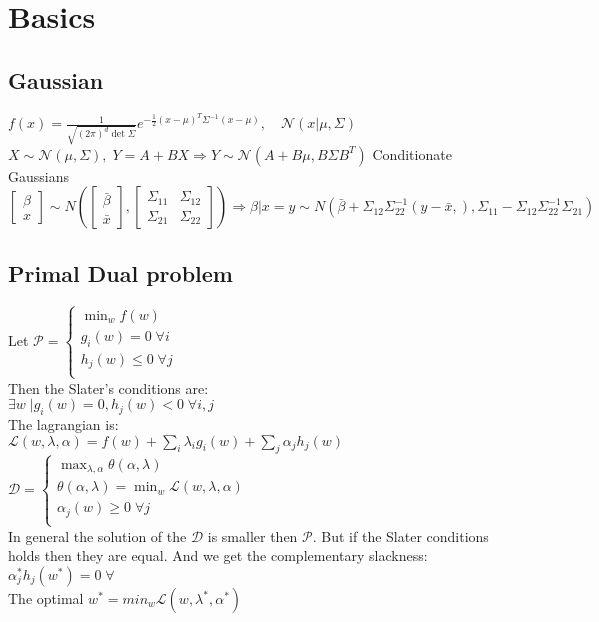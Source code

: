 \section{Basics}
\subsection*{Gaussian}
$f(x) = \frac{1}{\sqrt{(2\pi)^d\det\Sigma}} e^{- \frac{1}{2} (x-\mu)^T \Sigma^{-1} (x-\mu)},\quad \mathcal{N}(x|\mu, \Sigma)$\\
$X {\sim} \mathcal{N}(\mu,\Sigma),\;Y{=}A{+}BX \Rightarrow Y{\sim}\mathcal{N}(A{+}B\mu,B\Sigma B^T)$ 
Conditionate Gaussians\\
\(
\begin{bmatrix} \beta \\ x \end{bmatrix} \sim N\left(\begin{bmatrix}\bar{\beta} \\ \bar{x}\end{bmatrix},\begin{bmatrix} \Sigma_{11}&\Sigma_{12} \\\Sigma_{21}&\Sigma_{22} \end{bmatrix}\right)
\Rightarrow\beta\vert x=y \sim N\left(\bar{\beta} + \Sigma_{12}\Sigma^{-1}_{22}(y-\bar{x}, ) , \Sigma_{11}-\Sigma_{12}\Sigma^{-1}_{22}\Sigma_{21}\right)
\)
\subsection*{Primal Dual problem}
Let \(\mathcal{P} = 
	\begin{cases}
		\min_w f(w)\\
		g_i(w)=0\;\forall i\\
		h_j(w)\leq 0\;\forall j\\
	\end{cases}
	\)\\
Then the Slater's conditions are:\\
\(\exists w\; \vert g_i(w) = 0, h_j (w) < 0 \;\forall i,j\)\\
The lagrangian is:\\
\(\mathcal{L}(w,\lambda,\alpha)=f(w) + \sum_i\lambda_ig_i(w) + \sum_j \alpha_jh_j(w)\)\\
\(\mathcal{D} = 	
\begin{cases}
	\max_{\lambda,\alpha} \theta(\alpha, \lambda)\\
	\theta(\alpha, \lambda) = \min_w \mathcal{L}(w,\lambda,\alpha)\\
	\alpha_j(w)\geq 0\;\forall j\\
\end{cases}
\)\\
In general the solution of the \(\mathcal{D}\) is smaller then $\mathcal{P}$. But if the Slater conditions holds then they are equal. And we get the complementary slackness: \(\alpha_j^*h_j(w^*) = 0\;\forall\) \\
 The optimal $w^{*} = min_w {\mathcal{L}(w,\lambda^*,\alpha^*)}$

